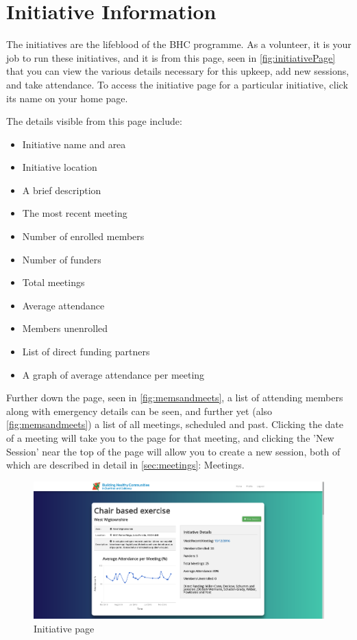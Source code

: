 \documentclass{bhcguides}
\begin{document}
\section{Initiative Information}
\label{sec:initiatives}

The initiatives are the lifeblood of the BHC programme. As a volunteer, it is your job to run these initiatives, and it is from this page, seen in \autoref{fig:initiativePage} that you can view the various details necessary for this upkeep, add new sessions, and take attendance. To access the initiative page for a particular initiative, click its name on your home page.

The details visible from this page include:
\begin{itemize}
	\item Initiative name and area
	\item Initiative location
	\item A brief description
	\item The most recent meeting
	\item Number of enrolled members
	\item Number of funders
	\item Total meetings
	\item Average attendance
	\item Members unenrolled
	\item List of direct funding partners
	\item A graph of average attendance per meeting
\end{itemize}

 Further down the page, seen in \autoref{fig:memsandmeets}, a list of attending members along with emergency details can be seen, and further yet (also \autoref{fig:memsandmeets}) a list of all meetings, scheduled and past. Clicking the date of a meeting will take you to the page for that meeting, and clicking the 'New Session' near the top of the page will allow you to create a new session, both of which are described in detail in \autoref{sec:meetings}: Meetings.

\begin{figure}[h]
 \centerline{\includegraphics[width=\textwidth, height=\textheight, keepaspectratio]{initiativepage.png}}
 \caption{Initiative page}
 \label{fig:initiativePage}
\end{figure}
\end{document}
